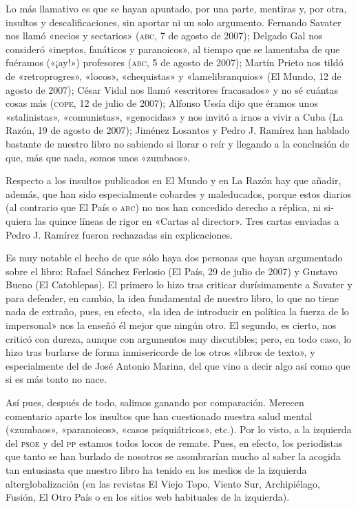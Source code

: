 \documentclass[draft,9pt,letterpaper,twocolumn,openany]{extbook}
\begin{document}
Lo más llamativo es que se hayan apuntado, por una parte, mentiras y, por otra,
insultos y descalificaciones, sin aportar ni un solo argumento. Fernando Savater
nos llamó «necios y sectarios» (\textsc{abc}, 7 de agosto de 2007); Delgado Gal nos consideró «ineptos, fanáticos y paranoicos», al tiempo que se lamentaba de que fuéramos («¡ay!») profesores (\textsc{abc}, 5 de agosto de 2007); Martín Prieto nos tildó de
«retroprogres», «locos», «chequistas» y «lamelibranquios» (El Mundo, 12 de agosto
de 2007); César Vidal nos llamó «escritores fracasados» y no sé cuántas cosas
más (\textsc{cope}, 12 de julio de 2007); Alfonso Ussía dijo que éramos unos «stalinistas»,
«comunistas», «genocidas» y nos invitó a irnos a vivir a Cuba (La Razón, 19 de agosto de 2007); Jiménez Losantos y Pedro J. Ramírez han hablado bastante de nuestro libro no sabiendo si llorar o reír y llegando a la conclusión de que, más que nada,
somos unos «zumbaos».

Respecto a los insultos publicados en El Mundo y en La Razón hay que añadir,
además, que han sido especialmente cobardes y maleducados, porque estos diarios (al contrario que El País o \textsc{abc}) no nos han concedido derecho a réplica, ni si-
quiera las quince líneas de rigor en «Cartas al director». Tres cartas enviadas a Pedro J. Ramírez fueron rechazadas sin explicaciones.

Es muy notable el hecho de que sólo haya dos personas que hayan argumentado sobre el libro: Rafael Sánchez Ferlosio (El País, 29 de julio de 2007) y Gustavo
Bueno (El Catoblepas). El primero lo hizo tras criticar durísimamente a Savater y
para defender, en cambio, la idea fundamental de nuestro libro, lo que no tiene
nada de extraño, pues, en efecto, «la idea de introducir en política la fuerza de lo
impersonal» nos la enseñó él mejor que ningún otro. El segundo, es cierto, nos criticó con dureza, aunque con argumentos muy discutibles; pero, en todo caso, lo
hizo tras burlarse de forma inmisericorde de los otros «libros de texto», y especialmente del de José Antonio Marina, del que vino a decir algo así como que si es
más tonto no nace. 

Así pues, después de todo, salimos ganando por comparación.
Merecen comentario aparte los insultos que han cuestionado nuestra salud
mental («zumbaos», «paranoicos», «casos psiquiátricos», etc.). Por lo visto, a la izquierda del \textsc{psoe} y del \textsc{pp} estamos todos locos de remate. Pues, en efecto, los
periodistas que tanto se han burlado de nosotros se asombrarían mucho al saber
la acogida tan entusiasta que nuestro libro ha tenido en los medios de la izquierda alterglobalización (en las revistas El Viejo Topo, Viento Sur, Archipiélago, Fusión, El Otro País o en los sitios web habituales de la izquierda). 
\end{document}
